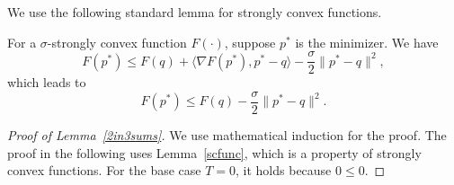 \documentclass[final,12pt]{colt2018} %
\begin{document}
We use the following standard lemma for strongly convex functions.
\begin{lemma} \label{scfunc}
	For a $\sigma$-strongly convex function $F(\cdot)$, suppose $p^*$ is the minimizer. We have $$F(p^*) \leq F(q) + \langle \nabla F(p^*), p^*- q  \rangle - \frac{\sigma}{2} \|  p^* - q \|^2,$$ which leads to
	$$F(p^*) \leq F(q)  - \frac{\sigma}{2} \| p^* - q \|^2.$$
\end{lemma}




\begin{proof}[Proof of Lemma~\ref{2in3sums}]

We use mathematical induction for the proof.
The proof in the following uses Lemma~\ref{scfunc}, which is a property of strongly convex functions.
For the base case $T=0$, it holds because $0\leq0$.


\end{proof}
\end{document}
